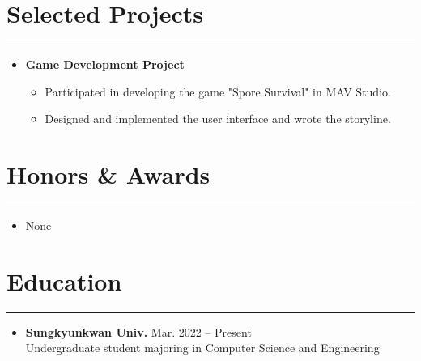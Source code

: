 \documentclass[letterpaper, 10pt]{article}
\begin{document}
\section*{Selected Projects} 
\hrule 
\vspace{4pt}
\begin{itemize}
\item[] 
\textbf{Game Development Project}
\begin{itemize}
    \item Participated in developing the game "Spore Survival" in MAV Studio.
    \item Designed and implemented the user interface and wrote the storyline.
\end{itemize}
\end{itemize}
\section*{Honors \& Awards} 
\hrule 
\vspace{4pt} 
\begin{itemize} 
\item[] None
\end{itemize}

\section*{Education} 
\hrule 
\vspace{4pt} 
\begin{itemize}
\item[] \textbf{Sungkyunkwan Univ.} \hfill Mar. 2022 -- Present \\
Undergraduate student majoring in Computer Science and Engineering
\end{itemize}
\end{document}
